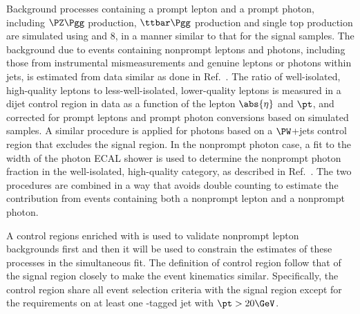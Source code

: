 \documentclass[11pt,twoside,a4paper,cmspaper]{cms-tdr}
\begin{document}
Background processes containing a prompt lepton and a prompt photon, including $\PZ\Pgg$ production, $\ttbar\Pgg$ production and single top production are simulated using \MGvATNLO and {\PYTHIA}8, in a manner similar to that for the signal samples. The background due to events containing nonprompt leptons and photons, including those from instrumental mismeasurements and genuine leptons or photons within jets, is estimated from data similar as done in Ref.~\cite{CMS:2021foa}. The ratio of well-isolated, high-quality leptons to less-well-isolated, lower-quality leptons is measured in a dijet control region in data as a function of the lepton $\abs{\eta}$ and $\pt$, and corrected for prompt leptons and prompt photon conversions based on simulated samples. A similar procedure is applied for photons based on a $\PW$+jets control region that excludes the signal region. In the nonprompt photon case, a fit to the width of the photon ECAL shower is used to determine the nonprompt photon fraction in the well-isolated, high-quality category, as described in Ref.~\cite{Sirunyan_2020}. The two procedures are combined in a way that avoids double counting to estimate the contribution from events containing both a nonprompt lepton and a nonprompt photon. 

A control regions enriched with {\ttst} is used to validate nonprompt lepton backgrounds first and then it will be used to constrain the estimates of these processes in the simultaneous fit. The definition of {\ttst} control region follow that of the signal region closely to make the event kinematics similar. Specifically, the control region share all event selection criteria with the signal region except for the requirements on at least one {\cPqb}-tagged jet with $\pt > 20\GeV$. 
\end{document}
